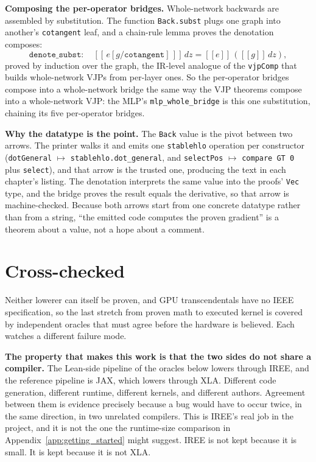 \medskip\noindent\textbf{Composing the per-operator bridges.} Whole-network
backwards are assembled by substitution. The function \texttt{Back.subst}
plugs one graph into another's \texttt{cotangent} leaf, and a chain-rule
lemma proves the denotation composes:
\[
  \texttt{denote\_subst}:\quad
  [\![\,e[g/\texttt{cotangent}]\,]\!]\,dz
  = [\![e]\!]\,([\![g]\!]\,dz),
\]
proved by induction over the graph, the IR-level analogue of the
\texttt{vjpComp} that builds whole-network VJPs from per-layer ones. So the
per-operator bridges compose into a whole-network bridge the same way the VJP
theorems compose into a whole-network VJP: the MLP's
\texttt{mlp\_whole\_bridge} is this one substitution, chaining its five
per-operator bridges.

\medskip\noindent\textbf{Why the datatype is the point.} The \texttt{Back}
value is the pivot between two arrows. The printer walks it and emits one
\texttt{stablehlo} operation per constructor (\texttt{dotGeneral} $\mapsto$
\texttt{stablehlo.dot\_general}, and \texttt{selectPos} $\mapsto$
\texttt{compare GT 0} plus \texttt{select}), and that arrow is the trusted
one, producing the text in each chapter's listing. The denotation interprets
the same value into the proofs' \texttt{Vec} type, and the bridge proves
the result equals the derivative, so that arrow is machine-checked. Because both arrows start from
one concrete datatype rather than from a string, ``the emitted code computes
the proven gradient'' is a theorem about a value, not a hope about a comment.

\section{Cross-checked}

Neither lowerer can itself be proven, and GPU transcendentals have no
IEEE specification, so the last stretch from proven math to executed
kernel is covered by independent oracles that must agree before the
hardware is believed. Each watches a different failure mode.

\medskip\noindent\textbf{The property that makes this work is that the two
sides do not share a compiler.} The Lean-side pipeline of the oracles below
lowers through IREE, and the reference pipeline is JAX, which lowers through XLA.
Different code generation, different runtime, different kernels, and different
authors. Agreement between them is evidence precisely because a bug would have
to occur twice, in the same direction, in two unrelated compilers. This is
IREE's real job in the project, and it is not the one the runtime-size
comparison in Appendix~\ref{app:getting_started} might suggest. IREE is not
kept because it is small. It is kept because it is not XLA.


